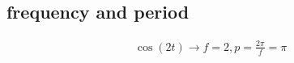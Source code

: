 \subsection{frequency and period}
    \begin{align*}
        \cos(2 t) \rightarrow f = 2, p = \frac{2 \pi}{f} = \pi
    \end{align*}